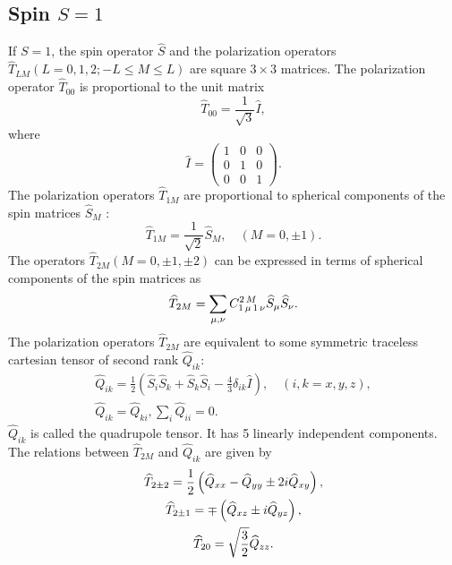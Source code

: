 \subsection{Spin $S=1$}\label{sec:2.6.1}
If $S=1$, the spin operator $\widehat{S}$ and the polarization operators $\widehat{T}_{L M}(L=0,1,2 ;-L \leq M \leq L)$ are square $3 \times 3$ matrices. The polarization operator $\widehat{T}_{00}$ is proportional to the unit matrix
\begin{equation}
\widehat{T}_{00}=\frac{1}{\sqrt{3}} \widehat{I} ,\label{eq:2:6:1}
\end{equation}
where
\begin{equation}
\widehat{I}=\begin{pmatrix}
1 & 0 & 0  \\
0 & 1 & 0 \\
0 & 0 & 1
\end{pmatrix}.\label{eq:2:6:2}
\end{equation}
The polarization operators $\widehat{T}_{1 M}$ are proportional to spherical components of the spin matrices $\widehat{S}_{M}$ :
\begin{equation}
\widehat{T}_{1 M}=\frac{1}{\sqrt{2}} \widehat{S}_{M}, \quad(M=0, \pm 1). \label{eq:2:6:3}
\end{equation}
The operators $\widehat{T}_{2 M}(M=0, \pm 1, \pm 2)$ can be expressed in terms of spherical components of the spin matrices as
\begin{equation}
\widehat{T}_{2 M}=\sum_{\mu, \nu} C_{1\,\mu\,1\,\nu}^{2\,M} \widehat{S}_{\mu} \widehat{S}_{\nu} .\label{eq:2:6:4}
\end{equation}
The polarization operators $\widehat{T}_{2 M}$ are equivalent to some symmetric traceless cartesian tensor of second rank $\widehat{Q}_{i k}:$
\begin{gather}
\hat{Q}_{i k}=\frac{1}{2}\left(\widehat{S}_{i} \widehat{S}_{k}+\widehat{S}_{k} \widehat{S}_{i}-\frac{4}{3} \delta_{i k} \widehat{I}\right), \quad(i, k=x, y, z)  ,\label{eq:2:6:5}\\
\widehat{Q}_{i k}=\widehat{Q}_{k i}, \sum_{i} \hat{Q}_{i i}=0 .\label{eq:2:6:6}
\end{gather}
$\widehat{Q}_{i k}$ is called the quadrupole tensor. It has 5 linearly independent components. The relations between $\widehat{T}_{2 M}$ and $\widehat{Q}_{i k}$ are given by
\begin{gather}
\widehat{T}_{2 \pm 2}=\frac{1}{2}\left(\widehat{Q}_{x x}-\widehat{Q}_{y y} \pm 2 i \widehat{Q}_{x y}\right) , \notag\\
\widehat{T}_{2 \pm 1}=\mp\left(\widehat{Q}_{x z} \pm i \widehat{Q}_{y z}\right),  \label{eq:2:6:7}\\
\widehat{T}_{20}=\sqrt{\frac{3}{2}} \widehat{Q}_{z z} .\notag
\end{gather}

